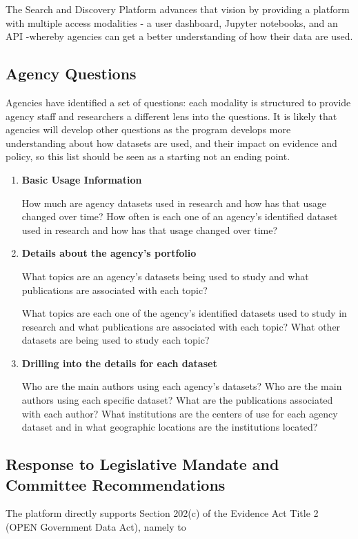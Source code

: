 \documentclass[titlepage, 11pt]{article}
\begin{document}
{The Search and Discovery Platform advances that vision by providing a platform with multiple access modalities - a user dashboard, Jupyter notebooks, and an API -whereby agencies can get a better understanding of how their data are used.   

\subsection{Agency Questions}\label{subsec:Agencyquestions}
Agencies have identified a set of questions: each modality is structured to provide agency staff and researchers a different lens into the questions. It is likely that agencies will develop other questions as the program develops more understanding about how datasets are used, and their impact on evidence and policy, so this list should be seen as a starting not an ending point.

\begin {enumerate}
\item \textbf{Basic Usage Information}

How much are agency datasets used in research and how has that usage changed over time? How often is each one of an agency’s identified dataset used in research and how has that usage changed over time?

\item \textbf{Details about the agency’s portfolio}

What topics are an agency’s datasets being used to study and what publications are associated with each topic?

What topics are each one of the agency’s identified datasets used to study in research and what publications are associated with each topic? What other datasets are being used to study each topic?

\item \textbf{Drilling into the details for each dataset}

Who are the main authors using each agency’s datasets? Who are the main authors using each specific dataset?  What are the publications associated with each author?  What institutions are the centers of use for each agency dataset and in what geographic locations are the institutions located?
\end{enumerate}

\subsection{Response to Legislative Mandate and Committee Recommendations} \label{sec:Response to Legislative Mandate and Committee Recommendations}
The platform directly supports Section 202(c) of the Evidence Act Title 2 (OPEN Government Data Act), namely to

}
\end{document}
